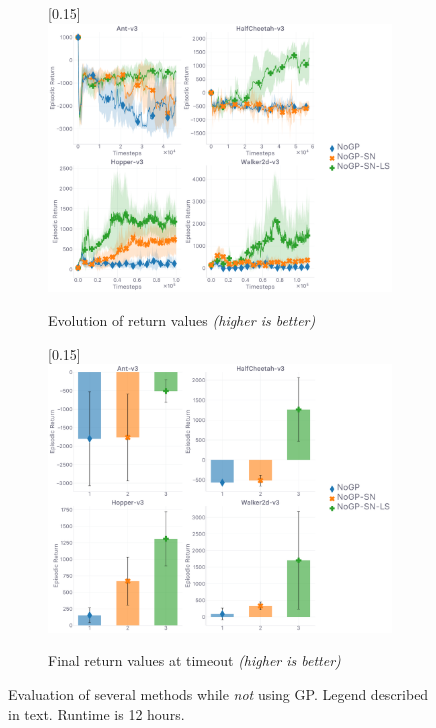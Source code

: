 \begin{figure}
  \center
  \begin{subfigure}[t]{0.49\textwidth}
    \center\scalebox{0.15}[0.15]{\includegraphics{Plots/fig02_nogp_12h_4envs/plots_eval_env_ret_plot.pdf}}
    \caption{Evolution of return values \textit{(higher is better)}}
  \end{subfigure}
  \begin{subfigure}[t]{0.49\textwidth}
    \center\scalebox{0.15}[0.15]{\includegraphics{Plots/fig02_nogp_12h_4envs/plots_eval_env_ret_barplot.pdf}}
    \caption{Final return values at timeout \textit{(higher is better)}}
  \end{subfigure}
  \caption{
  Evaluation of several methods while \emph{not} using GP.
  Legend described in text.
  Runtime is 12 hours.}
  \label{resplotsnogp}
\end{figure}

